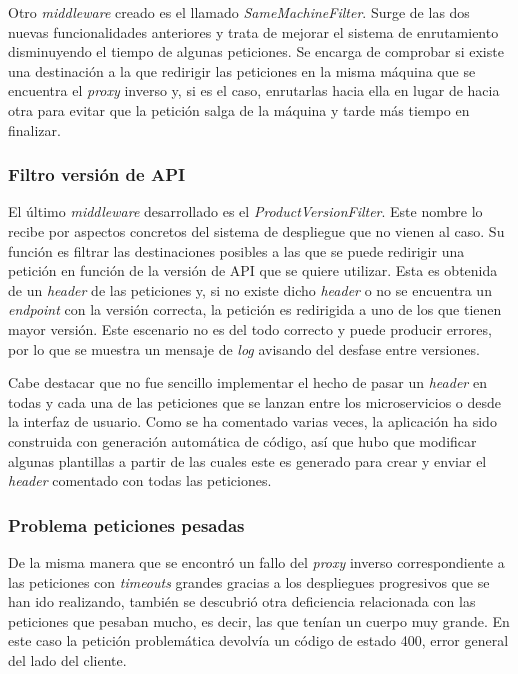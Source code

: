 \documentclass[11pt,spanish,listoffigures]{tfgetsinf}
\begin{document}
Otro \emph{middleware} creado es el llamado \emph{SameMachineFilter}. Surge de las dos nuevas funcionalidades anteriores y trata de mejorar el sistema de enrutamiento disminuyendo el tiempo de algunas peticiones. Se encarga de comprobar si existe una destinación a la que redirigir las peticiones en la misma máquina que se encuentra el \emph{proxy} inverso y, si es el caso, enrutarlas hacia ella en lugar de hacia otra para evitar que la petición salga de la máquina y tarde más tiempo en finalizar.


			\subsubsection{Filtro versión de API}

El último \emph{middleware} desarrollado es el \emph{ProductVersionFilter}. Este nombre lo recibe por aspectos concretos del sistema de despliegue que no vienen al caso. Su función es filtrar las destinaciones posibles a las que se puede redirigir una petición en función de la versión de API que se quiere utilizar. Esta es obtenida de un \emph{header} de las peticiones y, si no existe dicho \emph{header} o no se encuentra un \emph{endpoint} con la versión correcta, la petición es redirigida a uno de los que tienen mayor versión. Este escenario no es del todo correcto y puede producir errores, por lo que se muestra un mensaje de \emph{log} avisando del desfase entre versiones.

Cabe destacar que no fue sencillo implementar el hecho de pasar un \emph{header} en todas y cada una de las peticiones que se lanzan entre los microservicios o desde la interfaz de usuario. Como se ha comentado varias veces, la aplicación ha sido construida con generación automática de código, así que hubo que modificar algunas plantillas a partir de las cuales este es generado para crear y enviar el \emph{header} comentado con todas las peticiones.


			\subsubsection{Problema peticiones pesadas}

De la misma manera que se encontró un fallo del \emph{proxy} inverso correspondiente a las peticiones con \emph{timeouts} grandes gracias a los despliegues progresivos que se han ido realizando, también se descubrió otra deficiencia relacionada con las peticiones que pesaban mucho, es decir, las que tenían un cuerpo muy grande. En este caso la petición problemática devolvía un código de estado 400, error general del lado del cliente.
\end{document}
